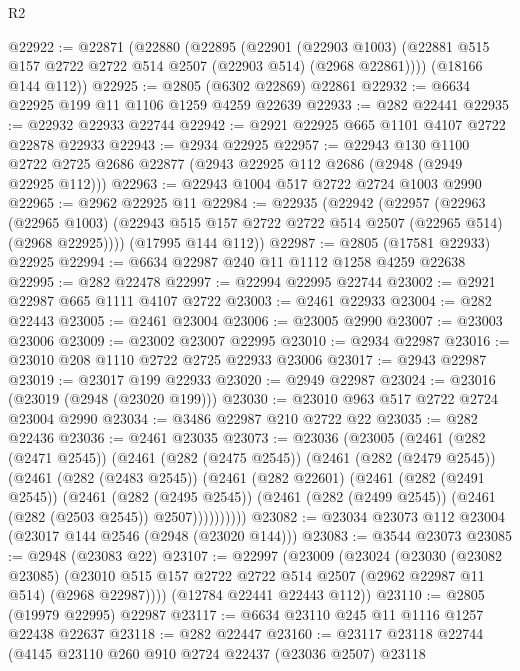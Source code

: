 \begin{lexlean}{R2}
\begin{coremodule}
@22922 := @22871
    (@22880
      (@22895
        (@22901
          (@22903 @1003)
          (@22881 @515 @157 @2722 @2722 @514 @2507 (@22903 @514) (@2968 @22861))))
      (@18166 @144 @112))
@22925 := @2805 (@6302 @22869) @22861
@22932 := @6634 @22925 @199 @11 @1106 @1259 @4259 @22639
@22933 := @282 @22441
@22935 := @22932 @22933 @22744
@22942 := @2921 @22925 @665 @1101 @4107 @2722 @22878 @22933
@22943 := @2934 @22925
@22957 := @22943
    @130
    @1100
    @2722
    @2725
    @2686
    @22877
    (@2943 @22925 @112 @2686 (@2948 (@2949 @22925 @112)))
@22963 := @22943 @1004 @517 @2722 @2724 @1003 @2990
@22965 := @2962 @22925 @11
@22984 := @22935
    (@22942
      (@22957
        (@22963
          (@22965 @1003)
          (@22943 @515 @157 @2722 @2722 @514 @2507 (@22965 @514) (@2968 @22925))))
      (@17995 @144 @112))
@22987 := @2805 (@17581 @22933) @22925
@22994 := @6634 @22987 @240 @11 @1112 @1258 @4259 @22638
@22995 := @282 @22478
@22997 := @22994 @22995 @22744
@23002 := @2921 @22987 @665 @1111 @4107 @2722
@23003 := @2461 @22933
@23004 := @282 @22443
@23005 := @2461 @23004
@23006 := @23005 @2990
@23007 := @23003 @23006
@23009 := @23002 @23007 @22995
@23010 := @2934 @22987
@23016 := @23010 @208 @1110 @2722 @2725 @22933 @23006
@23017 := @2943 @22987
@23019 := @23017 @199 @22933
@23020 := @2949 @22987
@23024 := @23016 (@23019 (@2948 (@23020 @199)))
@23030 := @23010 @963 @517 @2722 @2724 @23004 @2990
@23034 := @3486 @22987 @210 @2722 @22
@23035 := @282 @22436
@23036 := @2461 @23035
@23073 := @23036
    (@23005
      (@2461
        (@282 (@2471 @2545))
        (@2461
          (@282 (@2475 @2545))
          (@2461
            (@282 (@2479 @2545))
            (@2461
              (@282 (@2483 @2545))
              (@2461
                (@282 @22601)
                (@2461
                  (@282 (@2491 @2545))
                  (@2461
                    (@282 (@2495 @2545))
                    (@2461 (@282 (@2499 @2545)) (@2461 (@282 (@2503 @2545)) @2507))))))))))
@23082 := @23034 @23073 @112 @23004 (@23017 @144 @2546 (@2948 (@23020 @144)))
@23083 := @3544 @23073
@23085 := @2948 (@23083 @22)
@23107 := @22997
    (@23009
      (@23024
        (@23030
          (@23082 @23085)
          (@23010 @515 @157 @2722 @2722 @514 @2507 (@2962 @22987 @11 @514) (@2968 @22987))))
      (@12784 @22441 @22443 @112))
@23110 := @2805 (@19979 @22995) @22987
@23117 := @6634 @23110 @245 @11 @1116 @1257 @22438 @22637
@23118 := @282 @22447
@23160 := @23117
    @23118
    @22744
    (@4145
      @23110
      @260
      @910
      @2724
      @22437
      (@23036 @2507)
      @23118

\end{coremodule}
\end{lexlean}
